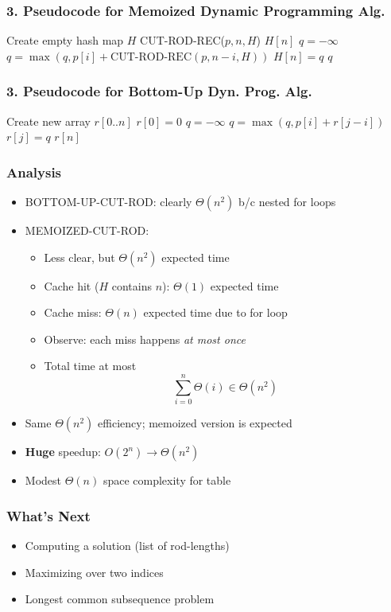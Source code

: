 \documentclass{beamer}
\begin{document}
\begin{frame} \frametitle{3. Pseudocode for \textbf{Memoized} Dynamic Programming Alg.}
      {\footnotesize
      \begin{algorithmic}[1]
        \State Create empty hash map $H$
        \State \Return CUT-ROD-REC($p, n, H$)
        \EndFunction
        \State \Return $H[n]$
        \EndIf
        \State {}
      \EndIf
      \State $q = -\infty$
        \State $q = \max(q, p[i] + \text{CUT-ROD-REC}(p, n-i, H))$
        \EndFor
        \State $H[n] = q$
      \State \Return $q$
    \EndFunction
      \end{algorithmic}
      }
\end{frame}

\begin{frame} \frametitle{3. Pseudocode for \textbf{Bottom-Up} Dyn. Prog. Alg.}
  \begin{algorithmic}[1]
    \State Create new array $r[0..n]$
    \State $r[0] = 0$ 
     
      \State $q = -\infty$
        \State $q = \max(q, p[i] + r[j-i])$ 
      \EndFor
      \State $r[j] = q$
      \EndFor
      \State \Return $r[n]$
      \EndFunction
  \end{algorithmic}
  \end{frame}

\begin{frame} \frametitle{Analysis}
  \begin{itemize}
  \item BOTTOM-UP-CUT-ROD: clearly $\Theta(n^2)$ b/c nested for loops
  \item MEMOIZED-CUT-ROD:
    \begin{itemize}
    \item Less clear, but $\Theta(n^2)$ expected time
    \item Cache hit ($H$ contains $n$): $\Theta(1)$ expected time
    \item Cache miss: $\Theta(n)$ expected time due to for loop
    \item Observe: each miss happens \emph{at most once}
    \item Total time at most
      \[ \sum_{i=0}^n \Theta(i) \in \Theta(n^2) \]
    \end{itemize}
  \item Same $\Theta(n^2)$ efficiency; memoized version is expected
  \item \textbf{Huge} speedup: $O(2^n) \longrightarrow \Theta(n^2)$
  \item Modest $\Theta(n)$ space complexity for table
  \end{itemize}
\end{frame}

\begin{frame} \frametitle{What's Next}
  \begin{itemize}
  \item Computing a solution (list of rod-lengths)
  \item Maximizing over two indices
  \item Longest common subsequence problem
  \end{itemize}
\end{frame}
\end{document}
